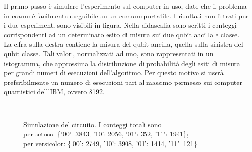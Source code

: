 Il primo passo è simulare l'esperimento sul computer in uso, dato che il problema in esame
è facilmente eseguibile su un comune portatile. I risultati non filtrati per i due esperimenti 
sono visibili in figura. Nella didascalia sono scritti i conteggi corrispondenti ad un 
determinato esito di misura sui due qubit ancilla e classe. La cifra sulla destra contiene la 
misura del qubit ancilla, quella sulla sinistra del qubit classe. Tali valori, normalizzati ad uno, 
sono rappresentati in un istogramma, che approssima la distribuzione di probabilità degli esiti di 
misura per grandi numeri di esecuzioni dell'algoritmo. Per questo motivo si userà preferibilmente 
un numero di esecuzioni pari al massimo permesso sui computer quantistici dell'IBM, ovvero 8192. 

\begin{figure}[h]
    \myfloatalign
     \\
    \caption{Simulazione del circuito. I conteggi totali sono\\
    per setosa: \{'00': 3843, '10': 2056, '01': 352, '11': 1941\}; \\
    per versicolor: \{'00': 2749, '10': 3908, '01': 1414, '11': 121\}.}
    \label{fig:simulazione_circuito}
\end{figure}

